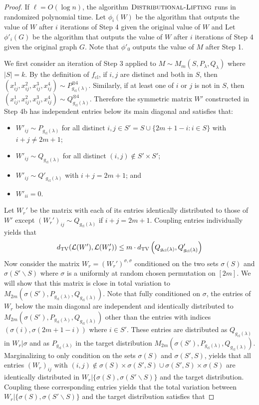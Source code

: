 \begin{proof}
If $\ell = O(\log n)$, the algorithm $\textsc{Distributional-Lifting}$ runs in randomized polynomial time. Let $\phi_i(W)$ be the algorithm that outputs the value of $W$ after $i$ iterations of Step 4 given the original value of $W$ and Let $\phi'_i(G)$ be the algorithm that outputs the value of $W$ after $i$ iterations of Step 4 given the original graph $G$. Note that $\phi'_0$ outputs the value of $M$ after Step 1.

We first consider an iteration of Step 3 applied to $M \sim M_m(S, P_{\lambda}, Q_{\lambda})$ where $|S| = k$. By the definition of $f_{\text{cl}}$, if $i, j$ are distinct and both in $S$, then $(x^1_{ij}, x^2_{ij}, x^3_{ij}, x^4_{ij}) \sim P_{g_{\text{cl}}(\lambda)}^{\otimes 4}$. Similarly, if at least one of $i$ or $j$ is not in $S$, then $(x^1_{ij}, x^2_{ij}, x^3_{ij}, x^4_{ij}) \sim Q_{g_{\text{cl}}(\lambda)}^{\otimes 4}$. Therefore the symmetric matrix $W'$ constructed in Step 4b has independent entries below its main diagonal and satisfies that:
\begin{itemize}
\item $W'_{ij} \sim P_{g_{\text{cl}}(\lambda)}$ for all distinct $i, j \in S' = S \cup \{ 2m + 1 - i : i \in S\}$ with $i + j \neq 2m + 1$;
\item $W'_{ij} \sim Q_{g_{\text{cl}}(\lambda)}$ for all distinct $(i, j) \not \in S' \times S'$;
\item $W'_{ij} \sim Q'_{g_{\text{cl}}(\lambda)}$ with $i + j = 2m + 1$; and
\item $W'_{ii} = 0$.
\end{itemize}
Let $W_r'$ be the matrix with each of its entries identically distributed to those of $W'$ except $(W_r')_{ij} \sim Q_{g_{\text{cl}}(\lambda)}$ if $i + j = 2m + 1$. Coupling entries individually yields that
$$d_{\text{TV}}(\mathcal{L}(W'), \mathcal{L}(W_r')) \le m \cdot d_{\text{TV}}\left( Q_{g_{\text{cl}}(\lambda)}, Q'_{g_{\text{cl}}(\lambda)} \right)$$
Now consider the matrix $W_r = (W_r')^{\sigma, \sigma}$ conditioned on the two sets $\sigma(S)$ and $\sigma(S' \backslash S)$ where $\sigma$ is a uniformly at random chosen permutation on $[2m]$. We will show that this matrix is close in total variation to $M_{2m}(\sigma(S'), P_{g_{\text{cl}}(\lambda)}, Q_{g_{\text{cl}}(\lambda)})$. Note that fully conditioned on $\sigma$, the entries of $W_r$ below the main diagonal are independent and identically distributed to $M_{2m}(\sigma(S'), P_{g_{\text{cl}}(\lambda)}, Q_{g_{\text{cl}}(\lambda)})$ other than the entries with indices $(\sigma(i), \sigma(2m + 1 - i))$ where $i \in S'$. These entries are distributed as $Q_{g_{\text{cl}}(\lambda)}$ in $W_r | \sigma$ and as $P_{g_{\text{cl}}(\lambda)}$ in the target distribution $M_{2m}(\sigma(S'), P_{g_{\text{cl}}(\lambda)}, Q_{g_{\text{cl}}(\lambda)})$. Marginalizing to only condition on the sets $\sigma(S)$ and $\sigma(S', S)$, yields that all entries $(W_r)_{ij}$ with $(i, j) \not \in \sigma(S) \times \sigma(S', S) \cup \sigma(S', S) \times \sigma(S)$ are identically distributed in $W_r | \{ \sigma(S), \sigma(S' \backslash S)\}$ and the target distribution. Coupling these corresponding entries yields that the total variation between $W_r | \{ \sigma(S), \sigma(S' \backslash S)\}$ and the target distribution satisfies that

\end{proof}
